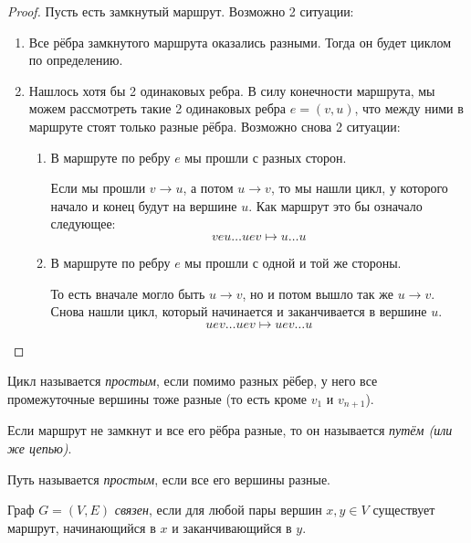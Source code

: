\begin{proof}
	Пусть есть замкнутый маршрут. Возможно 2 ситуации:
	\begin{enumerate}
		\item Все рёбра замкнутого маршрута оказались разными. Тогда он будет циклом по определению.
		
		\item Нашлось хотя бы 2 одинаковых ребра. В силу конечности маршрута, мы можем рассмотреть такие 2 одинаковых ребра $e = (v, u)$, что между ними в маршруте стоят только разные рёбра. Возможно снова 2 ситуации:
		\begin{enumerate}
			\item В маршруте по ребру $e$ мы прошли с разных сторон.
			
			Если мы прошли $v \to u$, а потом $u \to v$, то мы нашли цикл, у которого начало и конец будут на вершине $u$. Как маршрут это бы означало следующее:
			\[
				veu \ldots uev \mapsto u \ldots u
			\]
			
			\item В маршруте по ребру $e$ мы прошли с одной и той же стороны.
			
			То есть вначале могло быть $u \to v$, но и потом вышло так же $u \to v$. Снова нашли цикл, который начинается и заканчивается в вершине $u$.
			\[
				uev \ldots uev \mapsto uev \ldots u
			\]
		\end{enumerate}
	\end{enumerate}
\end{proof}

\begin{definition}
	Цикл называется \textit{простым}, если помимо разных рёбер, у него все промежуточные вершины тоже разные (то есть кроме $v_1$ и $v_{n + 1}$).
\end{definition}

\begin{definition}
	Если маршрут не замкнут и все его рёбра разные, то он называется \textit{путём (или же цепью)}.
\end{definition}

\begin{definition}
	Путь называется \textit{простым}, если все его вершины разные.
\end{definition}

\begin{definition}
	Граф $G = (V, E)$ \textit{связен}, если для любой пары вершин $x, y \in V$ существует маршрут, начинающийся в $x$ и заканчивающийся в $y$.
\end{definition}

